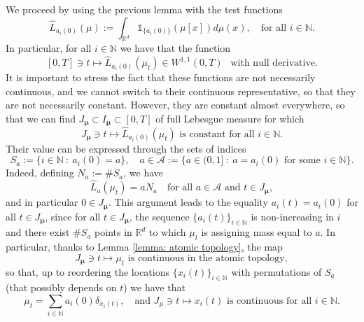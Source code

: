 \documentclass[10pt,leqno]{amsart}
\numberwithin{equation}{section}
\newcommand{\R}{\mathbb{R}}
\newcommand{\N}{\mathbb{N}}
\begin{document}
We proceed by using the previous lemma with the test functions 
\[\hat{L}_{a_i(0)} (\mu):= \int_{\R^d} \mathds{1}_{\{a_i(0)\}}(\mu[x]) d\mu(x), \quad \text{for all }i\in \N.\]
In particular, for all $i\in \N$ we have that the function 
\[[0,T]\ni t\mapsto \hat{L}_{a_i(0)}(\mu_t) \in W^{1,1}(0,T) \ \ \text{ with null derivative}.\]
It is important to stress the fact that these functions are not necessarily continuous, and we cannot switch to their continuous representative, so that they are not necessarily constant. However, they are constant almost everywhere, so that we can find $J_{\boldsymbol{\mu}}\subset I_{\boldsymbol{\mu}} \subset [0,T]$ of full Lebesgue measure for which 
\[J_{\boldsymbol{\mu}} \ni t \mapsto \hat{L}_{a_i(0)}(\mu_t) \text{ is constant for all } i\in \N.\]
Their value can be expressed through the sets of indices 
\[S_{a}:=\{i\in \N \ : \ a_i(0) = a\}, \quad a \in \mathcal{A}:= \{ a \in (0,1] \ : \ a = a_i(0) \text{ for some } i\in \N \}.\]
Indeed, defining $N_a:= \# S_a$, we have
\[\hat{L}_{a}(\mu_t) = a N_a \quad \text{for all }a\in \mathcal
A \text{ and } t\in J_{\boldsymbol{\mu}},\]
and in particular $0\in J_{\boldsymbol{\mu}}$. This argument leads to the equality $a_i(t) = a_i(0)$ for all $t\in J_{\boldsymbol{\mu}}$, since for all $t\in J_{\boldsymbol{\mu}}$, the sequence $\{a_i(t)\}_{i\in \N}$ is non-increasing in $i$ and there exist $\# S_a$ points in $\R^d$ to which $\mu_t$ is assigning mass equal to $a$. In particular, thanks to Lemma \ref{lemma: atomic topology}, the map 
\begin{equation}\label{eq: j_mu old}
J_{\boldsymbol{\mu}} \ni t\mapsto \mu_t \text{ is continuous in the atomic topology},
\end{equation}
so that, up to reordering the locations $\{x_i(t)\}_{i\in \N}$ with permutations of $S_{a}$ (that possibly depends on $t$) we have that 
\begin{equation}\label{eq: cont of particles old}
\mu_t = \sum_{i\in \N} a_i(0) \delta_{x_i(t)}, \quad \text{and }J_{\mu}\ni t \mapsto x_i(t) \text{ is continuous for all }i\in \N.
\end{equation}


\normalcolor

\fi
\end{document}

